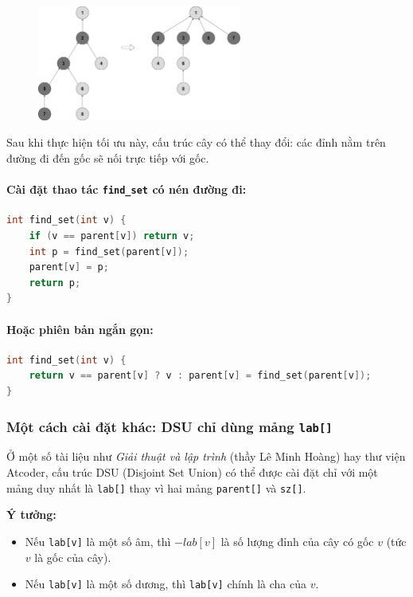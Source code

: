 \documentclass{article}
\begin{document}
\begin{figure}[h]
    \centering
    \includegraphics[width=0.6\textwidth]{img/b8/disjoint-set-union_img2.png}
\end{figure}

Sau khi thực hiện tối ưu này, cấu trúc cây có thể thay đổi: các đỉnh nằm trên đường đi đến gốc sẽ nối trực tiếp với gốc.

\paragraph{Cài đặt thao tác \texttt{find\_set} có nén đường đi:}
\begin{lstlisting}[language=C++]
int find_set(int v) {
    if (v == parent[v]) return v;
    int p = find_set(parent[v]);
    parent[v] = p;
    return p;
}
\end{lstlisting}

\paragraph{Hoặc phiên bản ngắn gọn:}
\begin{lstlisting}[language=C++]
int find_set(int v) {
    return v == parent[v] ? v : parent[v] = find_set(parent[v]);
}
\end{lstlisting}

\subsubsection*{Một cách cài đặt khác: DSU chỉ dùng mảng \texttt{lab[]}}

Ở một số tài liệu như \textit{Giải thuật và lập trình} (thầy Lê Minh Hoàng) hay thư viện Atcoder, cấu trúc DSU (Disjoint Set Union) có thể được cài đặt chỉ với một mảng duy nhất là \texttt{lab[]} thay vì hai mảng \texttt{parent[]} và \texttt{sz[]}.

\textbf{Ý tưởng:}
\begin{itemize}
    \item Nếu \texttt{lab[v]} là một số âm, thì $-lab[v]$ là số lượng đỉnh của cây có gốc $v$ (tức $v$ là gốc của cây).
    \item Nếu \texttt{lab[v]} là một số dương, thì \texttt{lab[v]} chính là cha của $v$.
\end{itemize}
\end{document}
